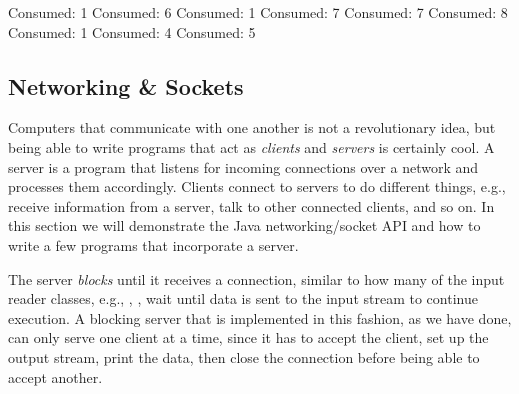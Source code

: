 \begin{verbnobox}[\small]
Consumed: 1
Consumed: 6
Consumed: 1
Consumed: 7
Consumed: 7
Consumed: 8
Consumed: 1
Consumed: 4
Consumed: 5
\end{verbnobox}

\subsection{Networking \& Sockets}

Computers that communicate with one another is not a revolutionary idea, but being able to write programs that act as \emph{clients} and \emph{servers} is certainly cool. A server is a program that listens for incoming connections over a network and processes them accordingly. Clients connect to servers to do different things, e.g., receive information from a server, talk to other connected clients, and so on. In this section we will demonstrate the Java networking/socket API and how to write a few programs that incorporate a server.


The server \emph{blocks} until it receives a connection, similar to how many of the input reader classes, e.g., , , wait until data is sent to the input stream to continue execution. A blocking server that is implemented in this fashion, as we have done, can only serve one client at a time, since it has to accept the client, set up the output stream, print the data, then close the connection before being able to accept another.

